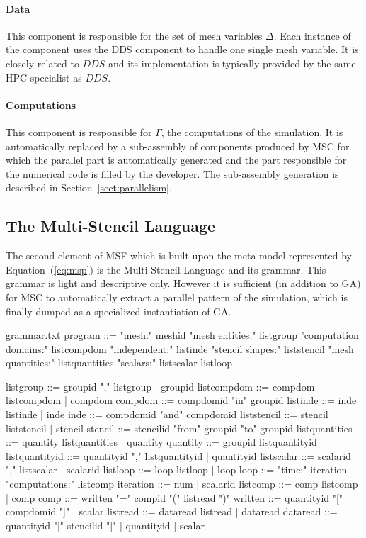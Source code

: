 \paragraph{\textbf{Data}}
This component is responsible for the set of mesh variables $\Delta$.
Each instance of the component uses the DDS component to handle one single mesh variable.
It is closely related to $DDS$ and its implementation is typically provided by the same HPC specialist as $DDS$.

\paragraph{\textbf{Computations}}
This component is responsible for $\Gamma$, \ie the computations of the simulation. 
It is automatically replaced by a sub-assembly of components produced by MSC for which the parallel part is automatically generated and the part responsible for the numerical code is filled by the developer.
The sub-assembly generation is described in Section~\ref{sect:parallelism}.

\subsection{The Multi-Stencil Language}

The second element of MSF which is built upon the meta-model represented by Equation~(\ref{eq:msp}) is the Multi-Stencil Language and its grammar. This grammar is light and descriptive only. However it is sufficient (in addition to GA) for MSC to automatically extract a parallel pattern of the simulation, which is finally dumped as a specialized instantiation of GA.

\begin{filecontents*}{grammar.txt}
program ::= "mesh:" meshid 
            "mesh entities:" listgroup
            "computation domains:" listcompdom
            "independent:" listinde
            "stencil shapes:" liststencil
            "mesh quantities:" listquantities
            "scalars:" listscalar
            listloop

listgroup ::= groupid "," listgroup | groupid
listcompdom ::= compdom listcompdom | compdom
compdom ::= compdomid "in" groupid
listinde ::= inde listinde | inde
inde ::= compdomid "and" compdomid
liststencil ::= stencil liststencil | stencil
stencil ::= stencilid "from" groupid "to" groupid
listquantities ::= quantity listquantities |  quantity
quantity ::= groupid listquantityid
listquantityid ::= quantityid "," listquantityid |  quantityid
listscalar ::= scalarid "," listscalar | scalarid
listloop ::= loop listloop | loop
loop ::=  "time:" iteration
          "computations:" listcomp
iteration ::= num | scalarid
listcomp ::= comp listcomp |  comp
comp ::= written "=" compid "(" listread ")"
written ::= quantityid "[" compdomid "]" | scalar
listread ::= dataread listread | dataread
dataread ::= quantityid "[" stencilid "]" |  quantityid | scalar
\end{filecontents*}

